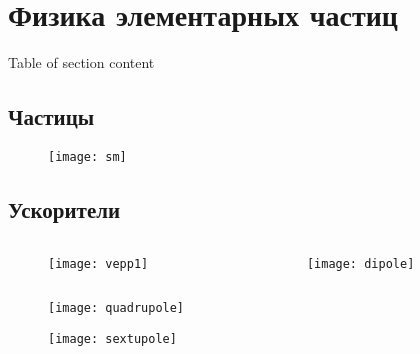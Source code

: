 \section{Физика элементарных частиц}
\begin{frame}{Table of section content}
    \tableofcontents[currentsection, subsectionstyle=show/show/hide]
\end{frame}
\subsection{Частицы}
\begin{frame}
    \begin{figure}
        \begin{centering}
            \texttt{[image: sm]}
        \end{centering}
    \end{figure}
\end{frame}

\subsection{Ускорители}
\begin{frame}
    \begin{columns}
        \begin{column}{0.5\textwidth}
            \begin{figure}
                \begin{centering}
                    \texttt{[image: vepp1]}
                \end{centering}
            \end{figure}
        \end{column}
        \begin{column}{0.5\textwidth}
            \begin{figure}
                \begin{centering}
                    \texttt{[image: dipole]}
                \end{centering}
            \end{figure}
        \end{column}
    \end{columns}
\end{frame}


\begin{frame}
    \begin{figure}
        \begin{centering}
            \texttt{[image: quadrupole]}
        \end{centering}
    \end{figure}
\end{frame}
\begin{frame}
    \begin{figure}
        \begin{centering}
            \texttt{[image: sextupole]}
        \end{centering}
    \end{figure}
\end{frame}

